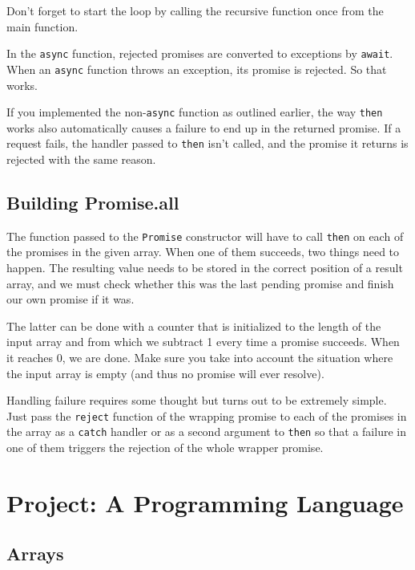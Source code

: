 Don't forget to start the loop by calling the recursive function once from the main function.

In the \lstinline`async` function, rejected promises are converted to exceptions by \lstinline`await`. When an \lstinline`async` function throws an exception, its promise is rejected. So that works.

If you implemented the non-\lstinline`async` function as outlined earlier, the way \lstinline`then` works also automatically causes a failure to end up in the returned promise. If a request fails, the handler passed to \lstinline`then` isn't called, and the promise it returns is rejected with the same reason.

\subsection{Building Promise.all}

The function passed to the \lstinline`Promise` constructor will have to call \lstinline`then` on each of the promises in the given array. When one of them succeeds, two things need to happen. The resulting value needs to be stored in the correct position of a result array, and we must check whether this was the last pending promise and finish our own promise if it was.

The latter can be done with a counter that is initialized to the length of the input array and from which we subtract 1 every time a promise succeeds. When it reaches 0, we are done. Make sure you take into account the situation where the input array is empty (and thus no promise will ever resolve).

Handling failure requires some thought but turns out to be extremely simple. Just pass the \lstinline`reject` function of the wrapping promise to each of the promises in the array as a \lstinline`catch` handler or as a second argument to \lstinline`then` so that a failure in one of them triggers the rejection of the whole wrapper promise.

\section{Project: A Programming Language}

\subsection{Arrays}

